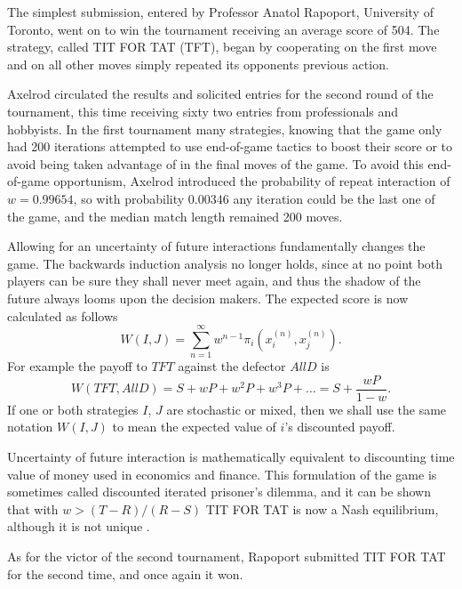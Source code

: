 The simplest submission, entered by Professor Anatol Rapoport, University of Toronto, went on to win the tournament receiving an average score of 504. The strategy, called TIT FOR TAT (TFT), began by cooperating on the first move and on all other moves simply repeated its opponents previous action.

Axelrod circulated the results and solicited entries for the second round of the tournament, this time receiving sixty two entries from professionals and hobbyists. In the first tournament many strategies, knowing that the game only had 200 iterations attempted to use end-of-game tactics to boost their score or to avoid being taken advantage of in the final moves of the game. To avoid this end-of-game opportunism, Axelrod introduced the probability of repeat interaction of $w = 0.99654$, so with probability $0.00346$ any iteration could be the last one of the game, and the median match length remained 200 moves.

Allowing for an uncertainty of future interactions fundamentally changes the game. The backwards induction analysis no longer holds, since at no point both players can be sure they shall never meet again, and thus the shadow of the future always looms upon the decision makers. The expected score is now calculated as follows
\[
W(I, J) = \sum_{n=1}^\infty w^{n-1} \pi_i(x_i^{(n)}, x_j^{(n)})
.\]
For example the payoff to $TFT$ against the defector $AllD$ is
\[
W(TFT, AllD) = S + wP + w^2P + w^3P + \dots = S + \frac{wP}{1-w}
.\]
If one or both strategies $I$, $J$ are stochastic or mixed, then we shall use the same notation $W(I, J)$ to mean the expected value of $i$'s discounted payoff.

Uncertainty of future interaction is mathematically equivalent to discounting time value of money used in economics and finance. This formulation of the game is sometimes called discounted iterated prisoner's dilemma, and it can be shown that with $w > (T-R)/(R-S)$ TIT FOR TAT is now a Nash equilibrium, although it is not unique \cite[p.207]{axelrod1984evolution}.

As for the victor of the second tournament, Rapoport submitted TIT FOR TAT for the second time, and once again it won.
\\
\\

